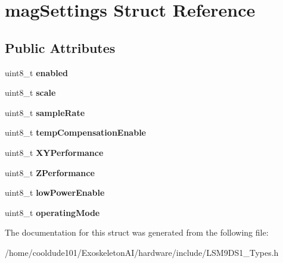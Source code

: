 \hypertarget{structmagSettings}{}\section{mag\+Settings Struct Reference}
\label{structmagSettings}
\subsection*{Public Attributes}
\begin{DoxyCompactItemize}
\item 
uint8\+\_\+t {\bfseries enabled}\hypertarget{structmagSettings_a97f8e5c4baf3fc9a662f84fedb188f3c}{}\label{structmagSettings_a97f8e5c4baf3fc9a662f84fedb188f3c}

\item 
uint8\+\_\+t {\bfseries scale}\hypertarget{structmagSettings_a5966915104376cb76d9eb787bab024bc}{}\label{structmagSettings_a5966915104376cb76d9eb787bab024bc}

\item 
uint8\+\_\+t {\bfseries sample\+Rate}\hypertarget{structmagSettings_aca3dbf81e533dce344e618a3df199c1e}{}\label{structmagSettings_aca3dbf81e533dce344e618a3df199c1e}

\item 
uint8\+\_\+t {\bfseries temp\+Compensation\+Enable}\hypertarget{structmagSettings_afcfa1e532fa140e42dc34a4abd7926ae}{}\label{structmagSettings_afcfa1e532fa140e42dc34a4abd7926ae}

\item 
uint8\+\_\+t {\bfseries X\+Y\+Performance}\hypertarget{structmagSettings_ad36c7bb251858fb289841c91fb615a5f}{}\label{structmagSettings_ad36c7bb251858fb289841c91fb615a5f}

\item 
uint8\+\_\+t {\bfseries Z\+Performance}\hypertarget{structmagSettings_a0ab41f0670a3fd20ce1a43332f6fe949}{}\label{structmagSettings_a0ab41f0670a3fd20ce1a43332f6fe949}

\item 
uint8\+\_\+t {\bfseries low\+Power\+Enable}\hypertarget{structmagSettings_abd59df268c0798fceacea68b956009df}{}\label{structmagSettings_abd59df268c0798fceacea68b956009df}

\item 
uint8\+\_\+t {\bfseries operating\+Mode}\hypertarget{structmagSettings_ae3f0044de2fbdff6d7b830c36f26c450}{}\label{structmagSettings_ae3f0044de2fbdff6d7b830c36f26c450}

\end{DoxyCompactItemize}


The documentation for this struct was generated from the following file\+:\begin{DoxyCompactItemize}
\item 
/home/cooldude101/\+Exoskeleton\+A\+I/hardware/include/L\+S\+M9\+D\+S1\+\_\+\+Types.\+h\end{DoxyCompactItemize}
